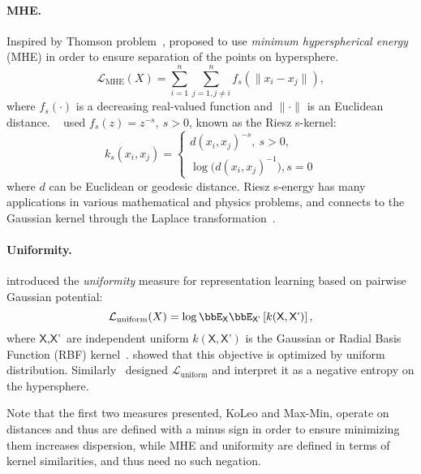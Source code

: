 \documentclass[10pt]{article} %
\newcommand\var[1]{\textsf{#1}}
\begin{document}
\paragraph{MHE.}
Inspired by Thomson problem~\citep{Gautam2013ANA},
\citet{liu2018learning,pmlr-v130-liu21d} proposed to use \textit{minimum hyperspherical energy} (MHE) in order to ensure separation of the points on hypersphere.
\begin{equation}
    \label{eq:mhe}
    \mathcal{L}_{\text{MHE}}(X) = \sum_{i=1}^n \sum_{j=1, j \neq i}^n f_s(\|x_i-x_j\|),
\end{equation}
where $f_s(\cdot)$ is a decreasing real-valued function and $\|\cdot \|$ is an Euclidean distance. ~\citet{liu2018learning,pmlr-v130-liu21d,lin2020regularizing} used $f_s(z) = z^{-s},\ s > 0$, known as the Riesz s-kernel:
\begin{equation*}
    k_s(x_i,x_j)=\begin{cases}
    d(x_i,x_j)^{-s},\ s > 0, \\
    \log \bigl(d(x_i,x_j)^{-1}\bigr), s=0
    \end{cases}
\end{equation*}
where $d$ can be Euclidean or geodesic distance. Riesz s-energy has many applications in various mathematical and physics problems, and connects to the Gaussian kernel through the Laplace transformation~\citep{borodachob2019discrete}.
\paragraph{Uniformity.} \citet{pmlr-v119-wang20k} introduced the \textit{uniformity} measure for representation learning based on pairwise Gaussian potential:
\begin{equation}
    \mathcal{L}_{\text{uniform}}(X) = \log \bbE_{\var{X}} \bbE_{\var{X'}} \left[ k(\var{X}, \var{X'}) \right],
\end{equation}
where $\var{X},\var{X'}$ are independent uniform  $k(\var{X}, \var{X'})$ is the Gaussian or Radial Basis Function (RBF) kernel~\citep{borodachob2019discrete}.  \citet{pmlr-v119-wang20k} showed that this objective is optimized by uniform distribution.
Similarly~\citet{Trosten-noHub-2023} designed $\mathcal{L}_{\text{uniform}}$ and interpret it as a negative entropy on the hypersphere.

Note that the first two measures presented, KoLeo and Max-Min, operate on distances and thus are defined with a minus sign in order to ensure minimizing them increases dispersion, while MHE and uniformity are defined in terms of kernel similarities, and thus need no such negation. 
\end{document}
